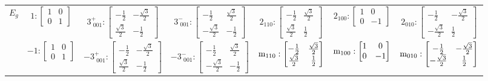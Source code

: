 \documentclass[fleqn,8pt,landscape]{jsarticle}
\begin{document}
\begin{longtable}{ccccccc}
$ E_{g} $ & $ 1:\begin{bmatrix} 1 & 0 \\ 0 & 1 \end{bmatrix} $ & $ 3^{+}_{\,\,001}:\begin{bmatrix} - \frac{1}{2} & - \frac{\sqrt{3}}{2} \\ \frac{\sqrt{3}}{2} & - \frac{1}{2} \end{bmatrix} $ & $ 3^{-}_{\,\,001}:\begin{bmatrix} - \frac{1}{2} & \frac{\sqrt{3}}{2} \\ - \frac{\sqrt{3}}{2} & - \frac{1}{2} \end{bmatrix} $ & $ 2{}_{110}:\begin{bmatrix} - \frac{1}{2} & \frac{\sqrt{3}}{2} \\ \frac{\sqrt{3}}{2} & \frac{1}{2} \end{bmatrix} $ & $ 2{}_{100}:\begin{bmatrix} 1 & 0 \\ 0 & -1 \end{bmatrix} $ & $ 2{}_{010}:\begin{bmatrix} - \frac{1}{2} & - \frac{\sqrt{3}}{2} \\ - \frac{\sqrt{3}}{2} & \frac{1}{2} \end{bmatrix} $ \\
& $ -1:\begin{bmatrix} 1 & 0 \\ 0 & 1 \end{bmatrix} $ & $ -3^{+}_{\,\,001}:\begin{bmatrix} - \frac{1}{2} & - \frac{\sqrt{3}}{2} \\ \frac{\sqrt{3}}{2} & - \frac{1}{2} \end{bmatrix} $ & $ -3^{-}_{\,\,001}:\begin{bmatrix} - \frac{1}{2} & \frac{\sqrt{3}}{2} \\ - \frac{\sqrt{3}}{2} & - \frac{1}{2} \end{bmatrix} $ & $ {\rm m}_{110}:\begin{bmatrix} - \frac{1}{2} & \frac{\sqrt{3}}{2} \\ \frac{\sqrt{3}}{2} & \frac{1}{2} \end{bmatrix} $ & $ {\rm m}_{100}:\begin{bmatrix} 1 & 0 \\ 0 & -1 \end{bmatrix} $ & $ {\rm m}_{010}:\begin{bmatrix} - \frac{1}{2} & - \frac{\sqrt{3}}{2} \\ - \frac{\sqrt{3}}{2} & \frac{1}{2} \end{bmatrix} $ \\ \hline

\end{longtable}
\end{document}

